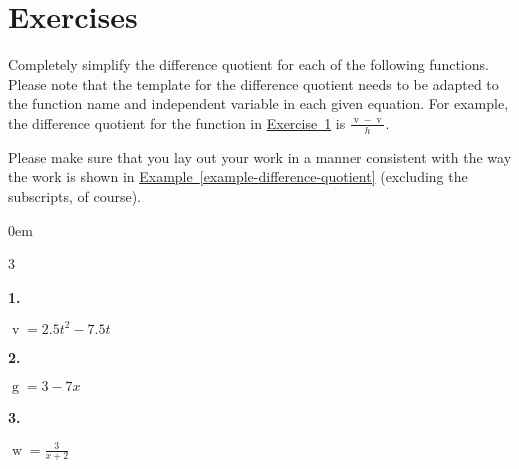 \documentclass[12pt,]{book}
\theoremstyle{plain}
\theoremstyle{definition}
\numberwithin{equation}{section}
\newenvironment{exercisegroup}%
{\medskip\noindent}%
{\par\bigskip}%
\newlength{\exercisegroupindent}%
\newlength{\exercisegroupitemwidth}%
\newenvironment{exercisegrouplist}%
{\vspace{-\partopsep}%
\begin{adjustwidth}{\exercisegroupindent}{0em}}%
{\end{adjustwidth}%
\vspace{-\partopsep}%
\vspace{\baselineskip}}%
\newenvironment{exercisegroupbycol}[1]%
{\begin{exercisegrouplist}%
\vspace{-\multicolsep}%
\begin{multicols}{#1}%
\setlength{\parindent}{0em}%
\setlength{\exercisegroupitemwidth}{\linewidth}}%
{\end{multicols}%
\vspace{-\multicolsep}%
\end{exercisegrouplist}}%
\newenvironment{exercisegroupitem}[1]%
{\begin{minipage}[t]{\exercisegroupitemwidth}
\vspace{0pt}%
{\bfseries#1}%
\rule{0pt}{\baselineskip}}{\strut%
\end{minipage}%
\hspace{\columnsep}}%
\providecommand\phantomsection{}
\newcommand{\fe}[2]{\mathop{{#1}{\left(#2\right)}}}
\begin{document}
\section*{Exercises}\label{exercises-3}

\begin{exercisegroup}%
Completely simplify the difference quotient for each of the following functions. Please note that the template for the difference quotient needs to be adapted to the function name and independent variable in each given equation. For example, the difference quotient for the function in \hyperref[exercise-first-difference-quotient]{Exercise~1} is \(\frac{\fe{v}{t+h}-\fe{v}{t}}{h}\).%
\par
Please make sure that you lay out your work in a manner consistent with the way the work is shown in \hyperref[example-difference-quotient]{Example~\ref*{example-difference-quotient}} (excluding the subscripts, of course).%
\begin{exercisegroupbycol}{3}%
\begin{exercisegroupitem}{1. }\phantomsection\hypertarget{exercise-first-difference-quotient}{\null}
\(\fe{v}{t}=2.5t^2-7.5t\)\end{exercisegroupitem}%
\par%
\begin{exercisegroupitem}{2. }\phantomsection\hypertarget{exercise-10}{\null}
\(\fe{g}{x}=3-7x\)\end{exercisegroupitem}%
\par%
\begin{exercisegroupitem}{3. }\phantomsection\hypertarget{exercise-11}{\null}
\(\fe{w}{x}=\frac{3}{x+2}\)\end{exercisegroupitem}%
\par%
\end{exercisegroupbycol}%
\end{exercisegroup}%
\end{document}

